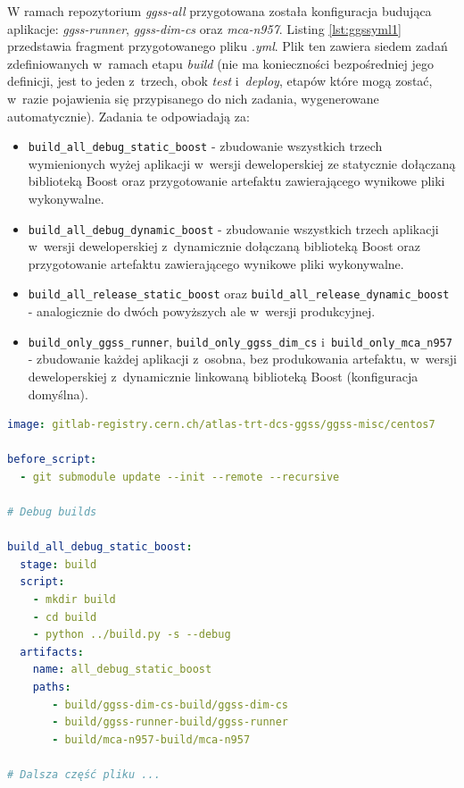 W ramach repozytorium \textit{ggss-all} przygotowana została konfiguracja budująca aplikacje: \textit{ggss-runner}, \textit{ggss-dim-cs} oraz \textit{mca-n957}. Listing \ref{lst:ggssyml1} przedstawia fragment przygotowanego pliku \textit{.yml}. Plik ten zawiera siedem zadań zdefiniowanych w~ramach etapu \textit{build} (nie ma konieczności bezpośredniej jego definicji, jest to jeden z~trzech, obok \textit{test} i~\textit{deploy}, etapów które mogą zostać, w~razie pojawienia się przypisanego do nich zadania, wygenerowane automatycznie). Zadania te odpowiadają za:
\begin{itemize}
\item \lstinline{build_all_debug_static_boost} - zbudowanie wszystkich trzech wymienionych wyżej aplikacji w~wersji deweloperskiej ze statycznie dołączaną biblioteką Boost oraz przygotowanie artefaktu zawierającego wynikowe pliki wykonywalne.
\item \lstinline{build_all_debug_dynamic_boost} - zbudowanie wszystkich trzech aplikacji w~wersji deweloperskiej z~dynamicznie dołączaną biblioteką Boost oraz przygotowanie artefaktu zawierającego wynikowe pliki wykonywalne.
\item \lstinline{build_all_release_static_boost} oraz \lstinline{build_all_release_dynamic_boost} - analogicznie do dwóch powyższych ale w~wersji produkcyjnej.
\item \lstinline{build_only_ggss_runner}, \lstinline{build_only_ggss_dim_cs} i~\lstinline{build_only_mca_n957} - zbudowanie każdej aplikacji z~osobna, bez produkowania artefaktu, w~wersji deweloperskiej z~dynamicznie linkowaną biblioteką Boost (konfiguracja domyślna).
\end{itemize}

\begin{lstlisting}[language=yaml, caption={Fragment pliku \textit{.gitlab-ci.yml} konfigurującego \textit{pipeline} CI/CD dla repozytorium \textit{ggss-all}}, label={lst:ggssyml1}]
image: gitlab-registry.cern.ch/atlas-trt-dcs-ggss/ggss-misc/centos7

before_script:
  - git submodule update --init --remote --recursive

# Debug builds 

build_all_debug_static_boost:
  stage: build
  script:
    - mkdir build
    - cd build
    - python ../build.py -s --debug
  artifacts:
    name: all_debug_static_boost
    paths:
       - build/ggss-dim-cs-build/ggss-dim-cs
       - build/ggss-runner-build/ggss-runner
       - build/mca-n957-build/mca-n957

# Dalsza część pliku ...

\end{lstlisting}

